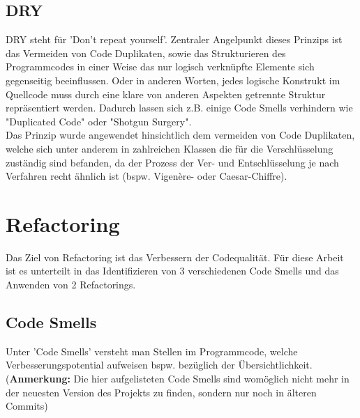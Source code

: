 \documentclass[12pt]{article}
\begin{document}
\subsection{DRY}
DRY steht für 'Don't repeat yourself'. Zentraler Angelpunkt dieses Prinzips ist das Vermeiden von Code Duplikaten, sowie das Strukturieren des Programmcodes in einer Weise das nur logisch verknüpfte Elemente sich gegenseitig beeinflussen. Oder in anderen Worten, jedes logische Konstrukt im Quellcode muss durch eine klare von anderen Aspekten getrennte Struktur repräsentiert werden. Dadurch lassen sich z.B. einige Code Smells verhindern wie "Duplicated Code" oder "Shotgun Surgery".\\
Das Prinzip wurde angewendet hinsichtlich dem vermeiden von Code Duplikaten, welche sich unter anderem in zahlreichen Klassen die für die Verschlüsselung zuständig sind befanden, da der Prozess der Ver- und Entschlüsselung je nach Verfahren recht ähnlich ist (bspw. Vigenère- oder Caesar-Chiffre).

\newpage

\section{Refactoring}
Das Ziel von Refactoring ist das Verbessern der Codequalität. Für diese Arbeit ist es unterteilt in das Identifizieren von 3 verschiedenen Code Smells und das Anwenden von 2 Refactorings.

\subsection{Code Smells}
Unter 'Code Smells' versteht man Stellen im Programmcode, welche Verbesserungspotential aufweisen bspw. bezüglich der Übersichtlichkeit.\\ (\textbf{Anmerkung: }Die hier aufgelisteten Code Smells sind womöglich nicht mehr in der neuesten Version des Projekts zu finden, sondern nur noch in älteren Commits)
\end{document}
